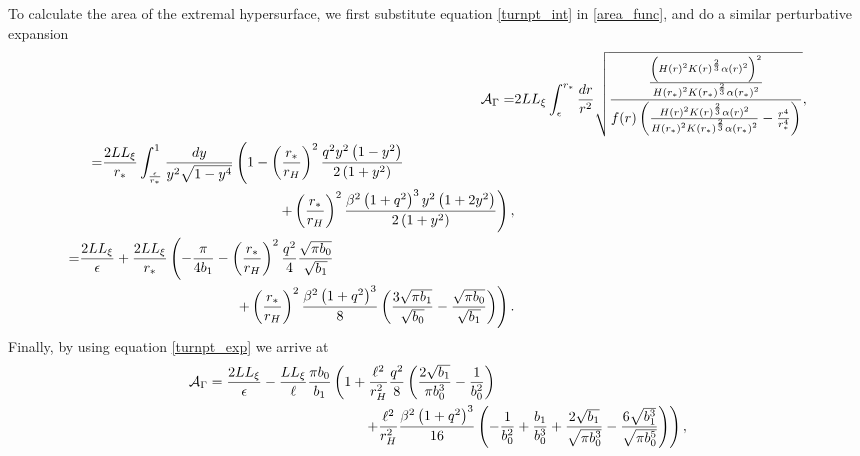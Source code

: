 \documentclass[12pt,a4paper]{article}
\numberwithin{equation}{section}
\begin{document}
%
To calculate the area of the extremal hypersurface, we first substitute equation \eqref{turnpt_int} in \eqref{area_func}, and do a similar perturbative expansion
%
\begin{align}
	\mathcal{A}_{\Gamma} = & 2 L L_{\xi} \int_{\epsilon}^{r_*} \frac{dr}{r^2} \sqrt{\frac{\frac{ \left( H\left(r\right)^2 K\left(r\right)^{\frac{2}{3}} \alpha\left(r\right)^2 \right)^2}{H\left(r_*\right)^2 K\left(r_{\ast}\right)^{\frac{2}{3}} \alpha\left(r_{\ast}\right)^2}}{f(r) \left( \frac{H\left(r\right)^2 K\left(r\right)^{\frac{2}{3}} \alpha\left(r\right)^2}{H\left(r_*\right)^2 K\left(r_{\ast}\right)^{\frac{2}{3}} \alpha\left(r_{\ast}\right)^2} - \frac{r^4}{r_*^4} \right)}}, \nonumber \\
    \begin{split}
    = & \frac{2 L L_{\xi}}{r_*} \int_{\frac{\epsilon}{r_{\ast}}}^{1} \frac{dy}{y^2 \sqrt{1 - y^4}} \left(1 - \left(\frac{r_*}{r_H}\right)^2 \frac{q^2 y^2 \left(1-y^2 \right)}{2 \left(1+y^2 \right)} \right. \\ &\hspace{4.4cm}\left. + \left(\frac{r_*}{r_H}\right)^2 \frac{\beta^2 \left(1+q^2\right)^3 y^2\left(1+2y^2\right)}{2\left(1+y^2\right)} \right), 
    \end{split}
	\nonumber \\
    \begin{split}
	= & \frac{2 L L_{\xi}}{\epsilon} + \frac{2 L L_{\xi}}{r_*} \left(- \frac{\pi}{4 b_1} - \left(\frac{r_*}{r_H}\right)^2 \frac{q^2}{4} \frac{\sqrt{\pi b_0}}{\sqrt{b_1}} \right. \\ &\hspace{3.9cm}\left. + \left(\frac{r_*}{r_H}\right)^2 \frac{\beta^2 \left(1+q^2\right)^3}{8} \left( \frac{3\sqrt{\pi b_1}}{\sqrt{b_0}} - \frac{\sqrt{\pi b_0}}{ \sqrt{b_1}} \right)  \right).
    \end{split}
\end{align}
%
Finally, by using equation \eqref{turnpt_exp} we arrive at
%
\begin{equation} \label{eqn:HEE_pert_answer}
    \begin{split}
        \mathcal{A}_{\Gamma} = \frac{2 L L_{\xi}}{\epsilon} &- \frac{L L_{\xi}}{\ell} \frac{\pi b_0}{b_1} \left(1 + \frac{\ell^2}{r_H^2} \frac{q^2}{8} \left( \frac{2\sqrt{b_1}}{\pi b_0^3} - \frac{1}{b_0^2} \right) \right. \\ &\hspace{2.55cm} \left. + \frac{\ell^2}{r_H^2} \frac{\beta^2 \left( 1 + q^2 \right)^3}{16} \left(-\frac{1}{b_0^2} + \frac{b_1}{b_0^3} + \frac{2\sqrt{b_1}}{\sqrt{\pi b_0^3}} - \frac{6\sqrt{b_1^3}}{\sqrt{\pi b_0^5}} \right) \right),
    \end{split}
\end{equation}
\end{document}
